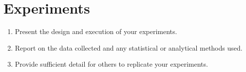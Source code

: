 \section{Experiments}

\begin{enumerate}
    \item Present the design and execution of your experiments.
    \item Report on the data collected and any statistical or analytical methods used.
    \item Provide sufficient detail for others to replicate your experiments.
\end{enumerate}
